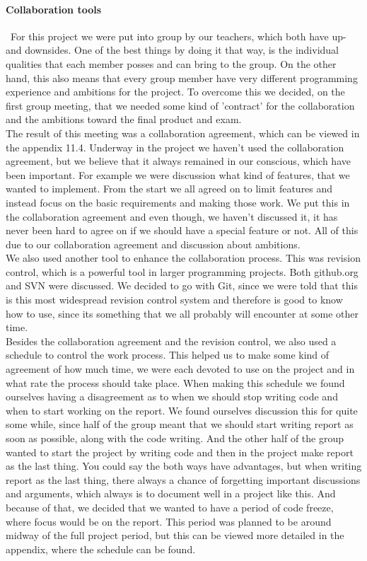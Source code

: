 \documentclass[a4paper,10pt,titlepage]{article}
\begin{document}
	\paragraph{Collaboration tools}\mbox{}\
	For this project we were put into group by our teachers, which both have up- and downsides. One of the best things by doing it that way, is the individual qualities that each member posses and can bring to the group. On the other hand, this also means that every group member have very different programming experience and ambitions for the project. To overcome this we decided, on the first group meeting, that we needed some kind of 'contract' for the collaboration and the ambitions toward the final product and exam.\\ The result of this meeting was a collaboration agreement, which can be viewed in the appendix 11.4. Underway in the project we haven't used the collaboration agreement, but we believe that it always remained in our conscious, which have been important. For example we were discussion what kind of features, that we wanted to implement. From the start we all agreed on to limit features and instead focus on the basic requirements and making those work. We put this in the collaboration agreement and even though, we haven't discussed it, it has never been hard to agree on if we should have a special feature or not. All of this due to our collaboration agreement and discussion about ambitions.\\
		We also used another tool to enhance the collaboration process. This was revision control, which is a powerful tool in larger programming projects. Both github.org and SVN were discussed. We decided to go with Git, since we were told that this is this most widespread revision control system and therefore is good to know how to use, since its something that we all probably will encounter at some other time.\\
		Besides the collaboration agreement and the revision control, we also used a schedule to control the work process. This helped us to make some kind of agreement of how much time, we were each devoted to use on the project and in what rate the process should take place. When making this schedule we found ourselves having a disagreement as to when we should stop writing code and when to start working on the report. We found ourselves discussion this for quite some while, since half of the group meant that we should start writing report as soon as possible, along with the code writing. And the other half of the group wanted to start the project by writing code and then in the project make report as the last thing. You could say the both ways have advantages, but when writing report as the last thing, there always a chance of forgetting important discussions and arguments, which always is to document well in a project like this. And because of that, we decided that we wanted to have a period of code freeze, where focus would be on the report. This period was planned to be around midway of the full project period, but this can be viewed more detailed in the appendix, where the schedule can be found.\\
		
\end{document}
